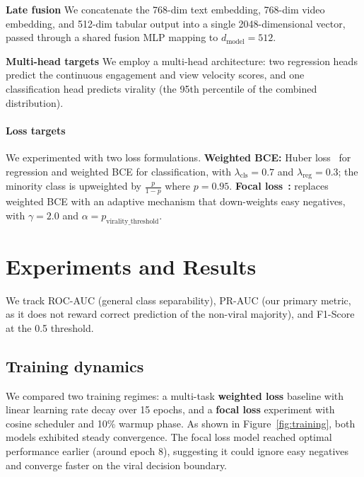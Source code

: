 \documentclass{article}
\begin{document}
\textbf{Late fusion}
We concatenate the 768-dim text embedding, 768-dim video embedding, and 512-dim
tabular output into a single 2048-dimensional vector, passed through a shared
fusion MLP mapping to $d_{\text{model}}{=}512$.

\textbf{Multi-head targets}
We employ a multi-head architecture: two regression heads predict the continuous
engagement and view velocity scores, and one classification head predicts
virality (the 95th percentile of the combined distribution).

\paragraph{Loss targets}                                                                                    We experimented with two loss formulations. \textbf{Weighted BCE:} Huber loss~\cite{huber1992robust} for regression and                                                                                                                                                                                                                                              
  weighted BCE for classification, with $\lambda_{\text{cls}}{=}0.7$ and
  $\lambda_{\text{reg}}{=}0.3$; the minority class is upweighted by
  $\frac{p}{1-p}$ where $p{=}0.95$.
  \textbf{Focal loss}~\cite{lin2017focal}\textbf{:} replaces weighted BCE with an
  adaptive mechanism that down-weights easy negatives, with $\gamma{=}2.0$ and
  $\alpha{=}p_{\text{virality\_threshold}}$.

\section{Experiments and Results}
\label{sec:experiments}

We track ROC-AUC (general class separability), PR-AUC (our primary metric, as it
does not reward correct prediction of the non-viral majority), and F1-Score at
the 0.5 threshold.

\subsection{Training dynamics}
\label{sec:training}

We compared two training regimes: a multi-task \textbf{weighted loss} baseline
with linear learning rate decay over 15 epochs, and a \textbf{focal loss}
experiment with cosine scheduler and 10\% warmup phase. As shown in
Figure~\ref{fig:training}, both models exhibited steady convergence. The focal
loss model reached optimal performance earlier (around epoch 8), suggesting it
could ignore easy negatives and converge faster on the viral decision boundary.
\end{document}
